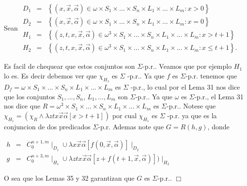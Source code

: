   Sean
  \(\displaystyle \begin{array}{rcl} D_{1} & =& \left\{ (x,\vec{x},\vec{\alpha})\in \omega \times S_{1}\times ...\times S_{n}\times L_{1}\times ...\times L_{m}:x >0\right\} \\ D_{2} & =& \left\{ (x,\vec{x},\vec{\alpha})\in \omega \times S_{1}\times ...\times S_{n}\times L_{1}\times ...\times L_{m}:x=0\right\} \\ H_{1} & =& \left\{ (z,t,x,\vec{x},\vec{\alpha})\in \omega ^{3}\times S_{1}\times ...\times S_{n}\times L_{1}\times ...\times L_{m}:x >t+1\right\} \\ H_{2} & =& \left\{ (z,t,x,\vec{x},\vec{\alpha})\in \omega ^{3}\times S_{1}\times ...\times S_{n}\times L_{1}\times ...\times L_{m}:x\leq t+1\right\} . \end{array} \)

  Es facil de chequear que estos conjuntos son \(\Sigma \)-p.r.. Veamos que por ejemplo \(H_{1}\) lo es. Es decir debemos ver que \(\chi _{H_{1}}\) es \(\Sigma \) -p.r.. Ya que \(f\) es \(\Sigma \)-p.r. tenemos que \(D_{f}=\omega \times S_{1}\times ...\times S_{n}\times L_{1}\times ...\times L_{m}\) es \(\Sigma \) -p.r., lo cual por el Lema 31 nos dice que los conjuntos \( S_{1},...,S_{n}\), \(L_{1},...,L_{m}\) son \(\Sigma \)-p.r.. Ya que \(\omega \) es \( \Sigma \)-p.r., el Lema 31 nos dice que \(R=\omega ^{3}\times S_{1}\times ...\times S_{n}\times L_{1}\times ...\times L_{m}\) es \(\Sigma \)-p.r.. Notese que \(\chi _{H_{1}}=(\chi _{R}\wedge \lambda ztx\vec{x} \vec{\alpha}\left[ x >t+1\right] )\) por cual \(\chi _{H_{1}}\) es \(\Sigma \) -p.r. ya que es la conjuncion de dos predicados \(\Sigma \)-p.r.
  Ademas note que \(G=R(h,g)\), donde

  \(\displaystyle \begin{array}{rcl} h & =& C_{0}^{n+1,m}\mid _{D_{1}}\cup \lambda x\vec{x}\vec{\alpha}\left[ f(0, \vec{x},\vec{\alpha})\right] \mid _{D_{2}} \\ g & =& C_{0}^{n+3,m}\mid _{H_{1}}\cup \lambda ztx\vec{x}\vec{\alpha}\left[ z+f(t+1,\vec{x},\vec{\alpha})\right] )\mid _{H_{2}} \end{array} \)

  O sea que los Lemas 35 y 32 garantizan que \(G\) es \( \Sigma \)-p.r.. \(\Box\)


